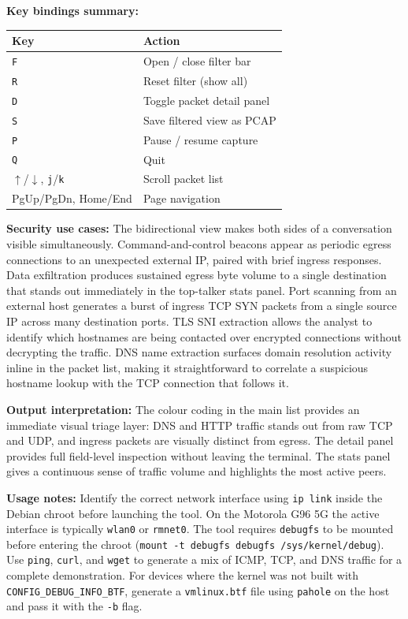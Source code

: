 \documentclass{mnitjaipur}
\begin{document}
\textbf{Key bindings summary:}
\begin{center}
\begin{tabular}{|l|l|}
\hline
\textbf{Key} & \textbf{Action} \\ \hline
\texttt{F} & Open / close filter bar \\ \hline
\texttt{R} & Reset filter (show all) \\ \hline
\texttt{D} & Toggle packet detail panel \\ \hline
\texttt{S} & Save filtered view as PCAP \\ \hline
\texttt{P} & Pause / resume capture \\ \hline
\texttt{Q} & Quit \\ \hline
$\uparrow$/$\downarrow$, \texttt{j}/\texttt{k} & Scroll packet list \\ \hline
PgUp/PgDn, Home/End & Page navigation \\ \hline
\end{tabular}
\end{center}

\textbf{Security use cases:} The bidirectional view makes both sides of a conversation visible simultaneously. Command-and-control beacons appear as periodic egress connections to an unexpected external IP, paired with brief ingress responses. Data exfiltration produces sustained egress byte volume to a single destination that stands out immediately in the top-talker stats panel. Port scanning from an external host generates a burst of ingress TCP SYN packets from a single source IP across many destination ports. TLS SNI extraction allows the analyst to identify which hostnames are being contacted over encrypted connections without decrypting the traffic. DNS name extraction surfaces domain resolution activity inline in the packet list, making it straightforward to correlate a suspicious hostname lookup with the TCP connection that follows it.

\textbf{Output interpretation:} The colour coding in the main list provides an immediate visual triage layer: DNS and HTTP traffic stands out from raw TCP and UDP, and ingress packets are visually distinct from egress. The detail panel provides full field-level inspection without leaving the terminal. The stats panel gives a continuous sense of traffic volume and highlights the most active peers.

\textbf{Usage notes:} Identify the correct network interface using \texttt{ip link} inside the Debian chroot before launching the tool. On the Motorola G96 5G the active interface is typically \texttt{wlan0} or \texttt{rmnet0}. The tool requires \texttt{debugfs} to be mounted before entering the chroot (\texttt{mount -t debugfs debugfs /sys/kernel/debug}). Use \texttt{ping}, \texttt{curl}, and \texttt{wget} to generate a mix of ICMP, TCP, and DNS traffic for a complete demonstration. For devices where the kernel was not built with \texttt{CONFIG\_DEBUG\_INFO\_BTF}, generate a \texttt{vmlinux.btf} file using \texttt{pahole} on the host and pass it with the \texttt{-b} flag.
\end{document}
